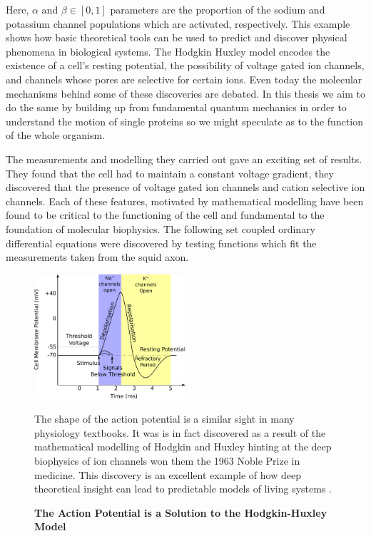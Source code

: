 Here, $\alpha$ and $\beta \in [0,1]$ parameters are the proportion of the sodium and potassium channel populations which are activated, respectively.  This example shows how basic theoretical tools can be used to predict and discover physical phenomena in biological systems. The Hodgkin Huxley model encodes the existence of a cell's resting potential, the possibility of voltage gated ion channels, and channels whose pores are selective for certain ions. Even today the molecular mechanisms behind some of these discoveries are debated. In this thesis we aim to do the same by building up from fundamental quantum mechanics in order to understand the motion of single proteins so we might speculate as to the function of the whole organism.

The measurements and modelling they carried out gave an exciting set of results. They found that the cell had to maintain a constant voltage gradient, they discovered that the presence of voltage gated ion channels and cation selective ion channels\cite{hodgkin1952}. Each of these features, motivated by mathematical modelling have been found to be critical to the functioning of the cell and fundamental to the foundation of molecular biophysics. The following set coupled ordinary differential equations were discovered by testing functions which fit the measurements taken from the squid axon.   

\begin{figure}
	\begin{center}
		\includegraphics[width=0.5\textwidth]{figures/Hodgkin-Huxley_action_potential.pdf}
	\end{center}
	\captionsetup{singlelinecheck = false, justification=raggedright}
	\caption[The Action Potential is a Solution to the Hodkin-Huxley Model] {\textbf{The Action Potential is a Solution to the Hodgkin-Huxley Model }}{The shape of the action potential is a similar sight in many physiology textbooks. It was is in fact discovered as a result of the mathematical modelling of Hodgkin and Huxley hinting at the deep biophysics of ion channels won them the 1963 Noble Prize in medicine. This discovery is an excellent example of how deep theoretical insight can lead to predictable models of living systems \cite{hodgkin1952, hodgkin1952a, hodgkin1952b, hodgkin1952c, hodgkin1952d}.}
	\label{action_potential_graphic}
\end{figure}

